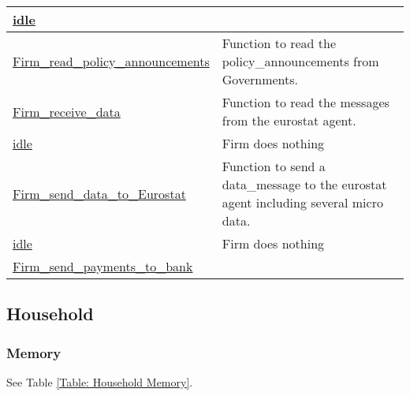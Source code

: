 \documentclass[a4paper,11pt]{article}
\begin{document}
\begin{landscape}
\begin{longtable}[H!]{ll}
\midrule
\url{idle} & \parbox{10cm}{} \\
\midrule
\url{Firm_read_policy_announcements} & \parbox{10cm}{Function to read the policy\_announcements from Governments.} \\
\midrule
\url{Firm_receive_data} & \parbox{10cm}{Function to read the messages from the eurostat agent.} \\
\midrule
\url{idle} & \parbox{10cm}{Firm does nothing} \\
\midrule
\url{Firm_send_data_to_Eurostat} & \parbox{10cm}{Function to send a data\_message to the eurostat agent including several micro data.} \\
\midrule
\url{idle} & \parbox{10cm}{Firm does nothing} \\
\midrule
\url{Firm_send_payments_to_bank} & \parbox{10cm}{} \\
\end{longtable}
\end{landscape}


\subsection{Household}

\subsubsection{Memory}

See Table \ref{Table: Household Memory}.
\end{document}
